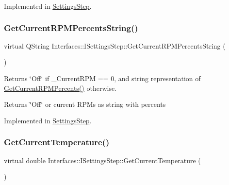 Implemented in \hyperlink{class_settings_step_a35bea9115637a0c848e8f827f2353c11}{Settings\+Step}.

\mbox{\label{class_interfaces_1_1_i_settings_step_a7575d43b7d178d700e161ec48e2c766f}} 
\subsubsection{\texorpdfstring{Get\+Current\+R\+P\+M\+Percents\+String()}{GetCurrentRPMPercentsString()}}
{\footnotesize\ttfamily virtual Q\+String Interfaces\+::\+I\+Settings\+Step\+::\+Get\+Current\+R\+P\+M\+Percents\+String (\begin{DoxyParamCaption}{ }\end{DoxyParamCaption})\hspace{0.3cm}{\ttfamily [pure virtual]}}



Returns \char`\"{}\+Off\char`\"{} if \+\_\+\+Current\+R\+PM == 0, and string representation of \hyperlink{class_interfaces_1_1_i_settings_step_abbbb49e91352212c6201a85f1a22253f}{Get\+Current\+R\+P\+M\+Percents()} otherwise. 

\begin{DoxyReturn}{Returns}
\char`\"{}\+Off\char`\"{} or current R\+P\+Ms as string with percents 
\end{DoxyReturn}


Implemented in \hyperlink{class_settings_step_a21e452401e180d6e114561a8b05ab1ae}{Settings\+Step}.

\mbox{\label{class_interfaces_1_1_i_settings_step_a62644690b7b63d27e72eca277a32bfdd}} 
\subsubsection{\texorpdfstring{Get\+Current\+Temperature()}{GetCurrentTemperature()}}
{\footnotesize\ttfamily virtual double Interfaces\+::\+I\+Settings\+Step\+::\+Get\+Current\+Temperature (\begin{DoxyParamCaption}{ }\end{DoxyParamCaption})\hspace{0.3cm}{\ttfamily [pure virtual]}}



